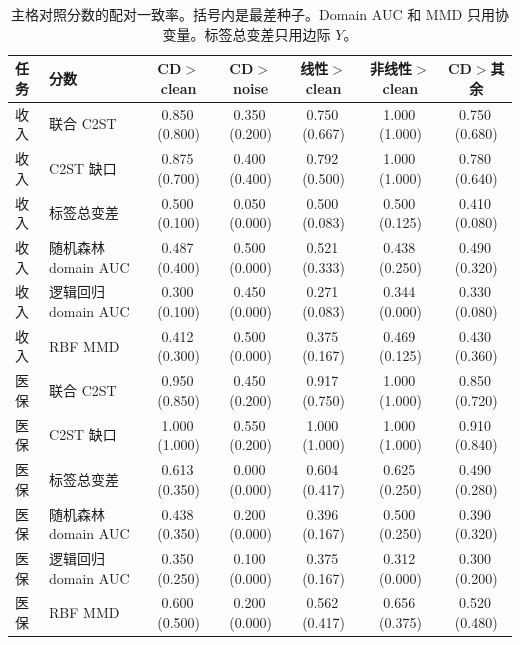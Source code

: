 \documentclass[11pt,a4paper,fontset=none]{ctexart}
\newcommand{\meanmin}[2]{#1\,{\scriptsize(#2)}}
\begin{document}
\begin{landscape}
\begin{table}[p]
\centering
\caption{主格对照分数的配对一致率。括号内是最差种子。Domain AUC 和 MMD 只用协变量。标签总变差只用边际 \(Y\)。}
\label{tab:concord-control}
\footnotesize
\begin{tabular}{@{}llccccc@{}}
\toprule
任务 & 分数 & CD\(>\)clean & CD\(>\)noise & 线性\(>\)clean & 非线性\(>\)clean & CD\(>\)其余 \\
\midrule
收入 & 联合 C2ST & \meanmin{0.850}{0.800} & \meanmin{0.350}{0.200} & \meanmin{0.750}{0.667} & \meanmin{1.000}{1.000} & \meanmin{0.750}{0.680} \\
收入 & C2ST 缺口 & \meanmin{0.875}{0.700} & \meanmin{0.400}{0.400} & \meanmin{0.792}{0.500} & \meanmin{1.000}{1.000} & \meanmin{0.780}{0.640} \\
收入 & 标签总变差 & \meanmin{0.500}{0.100} & \meanmin{0.050}{0.000} & \meanmin{0.500}{0.083} & \meanmin{0.500}{0.125} & \meanmin{0.410}{0.080} \\
收入 & 随机森林 domain AUC & \meanmin{0.487}{0.400} & \meanmin{0.500}{0.000} & \meanmin{0.521}{0.333} & \meanmin{0.438}{0.250} & \meanmin{0.490}{0.320} \\
收入 & 逻辑回归 domain AUC & \meanmin{0.300}{0.100} & \meanmin{0.450}{0.000} & \meanmin{0.271}{0.083} & \meanmin{0.344}{0.000} & \meanmin{0.330}{0.080} \\
收入 & RBF MMD & \meanmin{0.412}{0.300} & \meanmin{0.500}{0.000} & \meanmin{0.375}{0.167} & \meanmin{0.469}{0.125} & \meanmin{0.430}{0.360} \\
\midrule
医保 & 联合 C2ST & \meanmin{0.950}{0.850} & \meanmin{0.450}{0.200} & \meanmin{0.917}{0.750} & \meanmin{1.000}{1.000} & \meanmin{0.850}{0.720} \\
医保 & C2ST 缺口 & \meanmin{1.000}{1.000} & \meanmin{0.550}{0.200} & \meanmin{1.000}{1.000} & \meanmin{1.000}{1.000} & \meanmin{0.910}{0.840} \\
医保 & 标签总变差 & \meanmin{0.613}{0.350} & \meanmin{0.000}{0.000} & \meanmin{0.604}{0.417} & \meanmin{0.625}{0.250} & \meanmin{0.490}{0.280} \\
医保 & 随机森林 domain AUC & \meanmin{0.438}{0.350} & \meanmin{0.200}{0.000} & \meanmin{0.396}{0.167} & \meanmin{0.500}{0.250} & \meanmin{0.390}{0.320} \\
医保 & 逻辑回归 domain AUC & \meanmin{0.350}{0.250} & \meanmin{0.100}{0.000} & \meanmin{0.375}{0.167} & \meanmin{0.312}{0.000} & \meanmin{0.300}{0.200} \\
医保 & RBF MMD & \meanmin{0.600}{0.500} & \meanmin{0.200}{0.000} & \meanmin{0.562}{0.417} & \meanmin{0.656}{0.375} & \meanmin{0.520}{0.480} \\
\bottomrule
\end{tabular}
\end{table}
\end{landscape}
\end{document}
